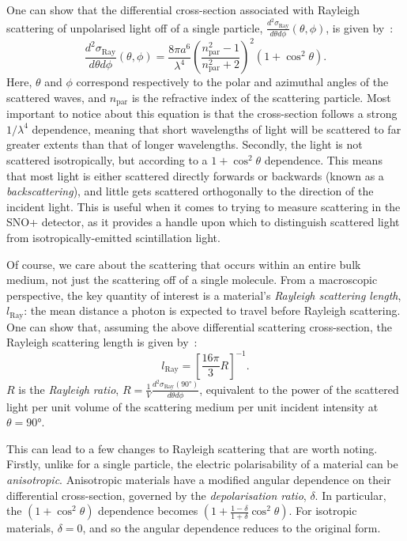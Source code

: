 One can show that the differential cross-section associated with Rayleigh scattering of unpolarised light off of a single particle, $\frac{d^{2}\sigma_{\textrm{Ray}}}{d\theta d\phi}\left(\theta,\phi\right)$,  is given by~\cite{}: %
\begin{equation}
    \frac{d^{2}\sigma_{\textrm{Ray}}}{d\theta d\phi}\left(\theta,\phi\right) = \frac{8\pi a^{6}}{\lambda^{4}}\left(\frac{n_{\textrm{par}}^{2}-1}{n_{\textrm{par}}^{2}+2}\right)^{2} \left(1+\cos^{2}\theta\right).
\end{equation}
Here, $\theta$ and $\phi$ correspond respectively to the polar and azimuthal angles of the scattered waves, and $n_{\mathrm{par}}$ is the refractive index of the scattering particle. Most important to notice about this equation is that the cross-section follows a strong $1/\lambda^{4}$ dependence, meaning that short wavelengths of light will be scattered to far greater extents than that of longer wavelengths. Secondly, the light is not scattered isotropically, but according to a $1+\cos^{2}\theta$ dependence. This means that most light is either scattered directly forwards or backwards (known as a \textit{backscattering}), and little gets scattered orthogonally to the direction of the incident light. This is useful when it comes to trying to measure scattering in the SNO+ detector, as it provides a handle upon which to distinguish scattered light from isotropically-emitted scintillation light.

Of course, we care about the scattering that occurs within an entire bulk medium, not just the scattering off of a single molecule. From a macroscopic perspective, the key quantity of interest is a material's \textit{Rayleigh scattering length}, $l_{\textrm{Ray}}$: the mean distance a photon is expected to travel before Rayleigh scattering. One can show that, assuming the above differential scattering cross-section, the Rayleigh scattering length is given by~\cite{}: %
\begin{equation}
    l_{\textrm{Ray}} = \left[\frac{16\pi}{3}R\right]^{-1}.
\end{equation}
$R$ is the \textit{Rayleigh ratio}, $R=\frac{1}{V}\frac{d^{2}\sigma_{\textrm{Ray}}\left(\ang{90}\right)}{d\theta d\phi}$, equivalent to the power of the scattered light per unit volume of the scattering medium per unit incident intensity at $\theta=\ang{90}$.

This can lead to a few changes to Rayleigh scattering that are worth noting. Firstly, unlike for a single particle, the electric polarisability of a material can be \textit{anisotropic}. Anisotropic materials have a modified angular dependence on their differential cross-section, governed by the \textit{depolarisation ratio}, $\delta$. In particular, the $\left(1+\cos^{2}\theta\right)$ dependence becomes $\left(1+\frac{1-\delta}{1+\delta}\cos^{2}\theta\right)$. For isotropic materials, $\delta=0$, and so the angular dependence reduces to the original form.

